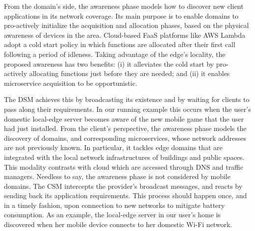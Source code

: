 From the domain's side, the awareness phase models how to discover new client applications in its network coverage. Its main purpose is to enable domains to pro-actively initialize the acquisition and allocation phases, based on the physical awareness of devices in the area. Cloud-based FaaS platforms like AWS Lambda adopt a cold start policy in which functions are allocated after their first call following a period of idleness. Taking advantage of the edge's locality, the proposed awareness has two benefits: (i) it alleviates the cold start by pro-actively allocating functions just before they are needed; and (ii) it enables microservice acquisition to be opportunistic.


The DSM achieves this by broadcasting its existence and by waiting for clients to pass along their requirements. In our running example this occurs when the user's domestic local-edge server becomes aware of the new mobile game that the user had just installed. 
From the client's perspective, the awareness phase models the discovery of domains, and corresponding microservices, whose network addresses are not previously known. In particular, it tackles edge domains that are integrated with the local network infrastructures of buildings and public spaces. This modality contrasts with cloud which are accessed through DNS and traffic managers. Needless to say, the awareness phase is not considered by mobile domains. The CSM intercepts the provider's broadcast messages, and reacts by sending back its application requirements. This process should happen once, and in a timely fashion, upon connection to new networks to mitigate battery consumption. As an example, the local-edge server in our user's home is discovered when her mobile device connects to her domestic Wi-Fi network. 


